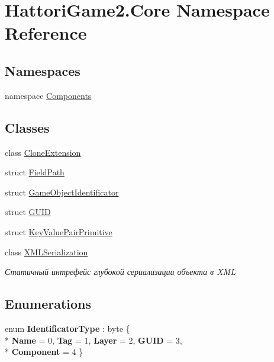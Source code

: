 \hypertarget{namespace_hattori_game2_1_1_core}{}\section{Hattori\+Game2.\+Core Namespace Reference}
\label{namespace_hattori_game2_1_1_core}
\subsection*{Namespaces}
\begin{DoxyCompactItemize}
\item 
namespace \hyperlink{namespace_hattori_game2_1_1_core_1_1_components}{Components}
\end{DoxyCompactItemize}
\subsection*{Classes}
\begin{DoxyCompactItemize}
\item 
class \hyperlink{class_hattori_game2_1_1_core_1_1_clone_extension}{Clone\+Extension}
\item 
struct \hyperlink{struct_hattori_game2_1_1_core_1_1_field_path}{Field\+Path}
\item 
struct \hyperlink{struct_hattori_game2_1_1_core_1_1_game_object_identificator}{Game\+Object\+Identificator}
\item 
struct \hyperlink{struct_hattori_game2_1_1_core_1_1_g_u_i_d}{G\+U\+I\+D}
\item 
struct \hyperlink{struct_hattori_game2_1_1_core_1_1_key_value_pair_primitive}{Key\+Value\+Pair\+Primitive}
\item 
class \hyperlink{class_hattori_game2_1_1_core_1_1_x_m_l_serialization}{X\+M\+L\+Serialization}
\begin{DoxyCompactList}\small\item\em Статичный интрефейс глубокой сериализации объекта в X\+M\+L \end{DoxyCompactList}\end{DoxyCompactItemize}
\subsection*{Enumerations}
\begin{DoxyCompactItemize}
\item 
\hypertarget{namespace_hattori_game2_1_1_core_abf7a191fc08d9eb2cb48f98d25bbd908}{}enum {\bfseries Identificator\+Type} \+: byte \{ \\*
{\bfseries Name} = 0, 
{\bfseries Tag} = 1, 
{\bfseries Layer} = 2, 
{\bfseries G\+U\+I\+D} = 3, 
\\*
{\bfseries Component} = 4
 \}\label{namespace_hattori_game2_1_1_core_abf7a191fc08d9eb2cb48f98d25bbd908}

\end{DoxyCompactItemize}
